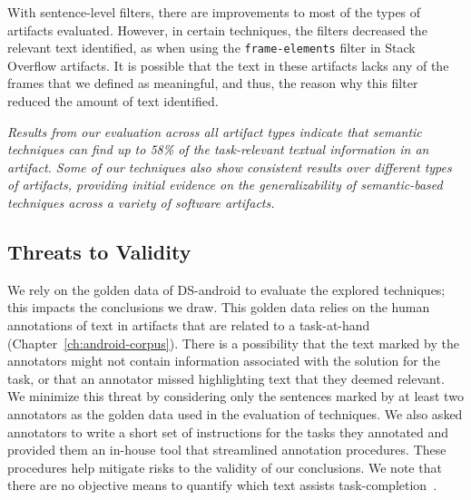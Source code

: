 With sentence-level filters, there are improvements to most of the types of artifacts evaluated. 
However, in certain techniques, the filters decreased the relevant text identified, as when using the  \texttt{frame-elements} filter in Stack Overflow artifacts.
It is possible that the text in these artifacts lacks any of the frames that we defined as meaningful, and thus, the reason why this filter reduced the amount of text identified.  





\medskip
\begin{bluequote}
    \textit{Results from our evaluation across all artifact types indicate that 
    semantic techniques can find up to 58\% of the task-relevant textual information in an artifact. 
    Some of our techniques also show consistent results over different types of artifacts, providing initial evidence on the generalizability of semantic-based techniques 
     across a variety of software artifacts.}
\end{bluequote}







\subsection{Threats to Validity}
\label{cp5:validity-threats}




We rely on the golden data of \acs{DS-android}
to evaluate the explored techniques; this impacts the 
conclusions we draw.
This golden data  relies on the
human annotations of text in artifacts that
are related to a task-at-hand (Chapter~\ref{ch:android-corpus}).
There is a possibility that the text marked by the annotators might not contain information 
associated with the solution for the task, or that an annotator missed highlighting
text that they deemed relevant.
We minimize this threat by considering only the 
sentences marked  by at least two annotators as the golden data used in the evaluation of techniques.
We also asked annotators to write a short set of instructions for the tasks they annotated
and provided them an in-house tool that streamlined annotation procedures.
These procedures help mitigate  risks to the validity of our conclusions. We note that
there are no objective means to quantify which text assists task-completion~\cite{Saracevic2007b, Saracevic2007c}. 






